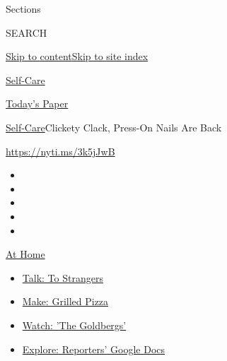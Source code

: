 Sections

SEARCH

\protect\hyperlink{site-content}{Skip to
content}\protect\hyperlink{site-index}{Skip to site index}

\href{https://www.nytimes3xbfgragh.onion/section/style/self-care/}{Self-Care}

\href{https://myaccount.nytimes3xbfgragh.onion/auth/login?response_type=cookie\&client_id=vi}{}

\href{https://www.nytimes3xbfgragh.onion/section/todayspaper}{Today's
Paper}

\href{/section/style/self-care/}{Self-Care}\textbar{}Clickety Clack,
Press-On Nails Are Back

\url{https://nyti.ms/3k5jJwB}

\begin{itemize}
\item
\item
\item
\item
\item
\end{itemize}

\href{https://www.nytimes3xbfgragh.onion/spotlight/at-home?action=click\&pgtype=Article\&state=default\&region=TOP_BANNER\&context=at_home_menu}{At
Home}

\begin{itemize}
\tightlist
\item
  \href{https://www.nytimes3xbfgragh.onion/2020/08/03/well/family/the-benefits-of-talking-to-strangers.html?action=click\&pgtype=Article\&state=default\&region=TOP_BANNER\&context=at_home_menu}{Talk:
  To Strangers}
\item
  \href{https://www.nytimes3xbfgragh.onion/2020/08/01/at-home/coronavirus-make-pizza-on-a-grill.html?action=click\&pgtype=Article\&state=default\&region=TOP_BANNER\&context=at_home_menu}{Make:
  Grilled Pizza}
\item
  \href{https://www.nytimes3xbfgragh.onion/2020/07/31/arts/television/goldbergs-abc-stream.html?action=click\&pgtype=Article\&state=default\&region=TOP_BANNER\&context=at_home_menu}{Watch:
  'The Goldbergs'}
\item
  \href{https://www.nytimes3xbfgragh.onion/interactive/2020/at-home/even-more-reporters-editors-diaries-lists-recommendations.html?action=click\&pgtype=Article\&state=default\&region=TOP_BANNER\&context=at_home_menu}{Explore:
  Reporters' Google Docs}
\end{itemize}

